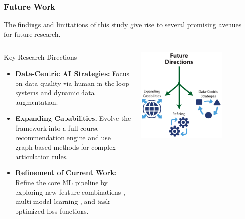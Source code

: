 \documentclass[aspectratio=169,10pt]{beamer}
\begin{document}
\begin{frame}
    \frametitle{Future Work}
    
    The findings and limitations of this study give rise to several promising avenues for future research.
    
    \begin{columns}[T]
        \begin{column}{0.45\textwidth}
            \begin{block}{Key Research Directions}
                \begin{itemize}
                    \item \textbf{Data-Centric AI Strategies:}  Focus on data quality via human-in-the-loop systems  and dynamic data augmentation.
                    \item \textbf{Expanding Capabilities:}  Evolve the framework into a full course recommendation engine  and use graph-based methods for complex articulation rules.
                    \item \textbf{Refinement of Current Work:}  Refine the core ML pipeline by exploring new feature combinations , multi-modal learning , and task-optimized loss functions.
                \end{itemize}
            \end{block}
        \end{column}
        
        \begin{column}{0.5\textwidth}
            
            \centering
            \includegraphics[width=0.75\textwidth]{future_directions.pdf}
            

\end{column}
\end{columns}
\end{frame}
\end{document}
